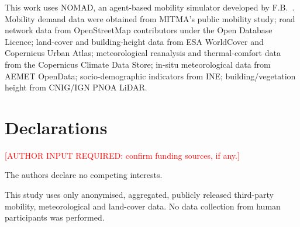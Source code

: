 \documentclass[pdflatex,sn-mathphys-ay]{sn-jnl}
\begin{document}
This work uses NOMAD, an agent-based mobility simulator developed by
F.B.\ \cite{nomad2026}. Mobility demand data were obtained from MITMA's public
mobility study; road network data from OpenStreetMap contributors under the
Open Database Licence; land-cover and building-height data from ESA
WorldCover and Copernicus Urban Atlas; meteorological reanalysis and
thermal-comfort data from the Copernicus Climate Data Store; in-situ
meteorological data from AEMET OpenData; socio-demographic indicators from
INE; building/vegetation height from CNIG/IGN PNOA LiDAR.

\section*{Declarations}

\textcolor{red}{[AUTHOR INPUT REQUIRED: confirm funding sources, if any.]}

The authors declare no competing interests.

This study uses only anonymised, aggregated, publicly released third-party
mobility, meteorological and land-cover data. No data collection from human
participants was performed.
\end{document}
